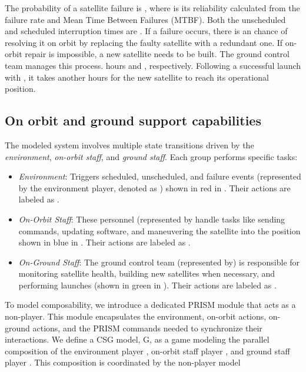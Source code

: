 The probability of a satellite failure is , where  is its reliability calculated from the failure rate and Mean Time Between Failures (MTBF). Both the unscheduled and scheduled interruption times are . If a failure occurs, there is an  chance of resolving it on orbit by replacing the faulty satellite with a redundant one. If on-orbit repair is impossible, a new satellite needs to be built. The ground control team manages this process.    hours and , respectively. Following a successful launch with , it takes another   hours for the new satellite to reach its operational position.


\subsection{On orbit and ground support capabilities}
\label{humanlabel}


The modeled system involves multiple state transitions driven by the \emph{environment}, \emph{on-orbit staff}, and \emph{ground staff}. Each group performs specific tasks:
\begin{itemize}
	\item \emph{Environment}: Triggers scheduled, unscheduled, and failure events (represented by the environment player, denoted as ) shown in red in . Their actions are labeled as \emath{\alpha}.
	\item  \emph{On-Orbit Staff}: These personnel (represented by   handle tasks like sending commands, updating software, and maneuvering the satellite into the position shown in blue in . Their actions are labeled as \emath{\beta}.
	\item \emph{On-Ground Staff}:  The ground control team (represented by) is responsible for monitoring satellite health, building new satellites when necessary, and performing launches (shown in green in ). Their actions are labeled as \emath{\omega}.
\end{itemize}


To model composability, we introduce a dedicated PRISM module that acts as a non-player. This module encapsulates the environment, on-orbit actions, on-ground actions, and the PRISM commands needed to synchronize their interactions. We define a CSG model, G, as a game modeling the parallel composition of the environment player , on-orbit staff player , and ground staff player . This composition is coordinated by the non-player model 


